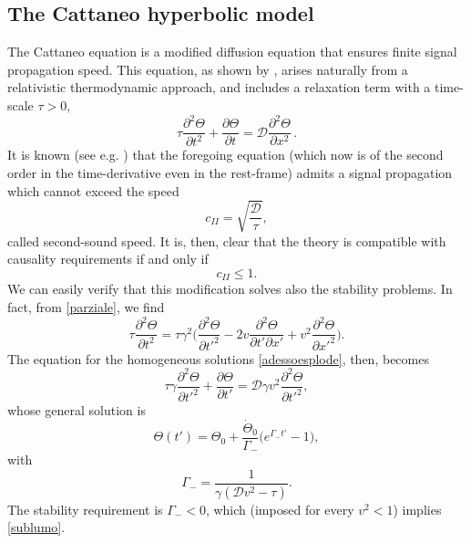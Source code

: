 \documentclass[a4paper, amsfonts, amssymb, amsmath, reprint, showkeys, nofootinbib, twoside]{revtex4-1}
\begin{document}
\subsection{The Cattaneo hyperbolic model}

The Cattaneo equation \citep{cattaneo1958} is a  modified diffusion equation that ensures finite signal propagation speed. This equation, as shown by \citet{Israel_Stewart_1979}, arises naturally from a relativistic thermodynamic approach, and 
includes a relaxation term with a time-scale $\tau>0$, 
%
\begin{equation}\label{cattaneoequation}
\tau \dfrac{\partial^2 \Theta}{\partial t^2} +\dfrac{\partial \Theta}{\partial t} = \mathcal{D} \dfrac{\partial^2 \Theta}{\partial x^2}\, .
\end{equation}
%
It is known (see e.g. \cite{Kost2000}) that the foregoing equation (which now is of the second order in the time-derivative even in the rest-frame) admits a signal propagation which cannot exceed the speed
\begin{equation}
c_{II} = \sqrt{\dfrac{\mathcal{D}}{\tau}},
\end{equation} 
called second-sound speed. It is, then, clear that the theory is compatible with causality requirements if and only if
\begin{equation}\label{sublumo}
c_{II} \leq 1.
\end{equation}
We can easily verify that this modification solves also the stability problems. In fact, from \eqref{parziale}, we find
\begin{equation}
\tau \dfrac{\partial^2 \Theta}{\partial t^2} = \tau \gamma^2 \bigg( \dfrac{\partial^2 \Theta}{\partial {t'}^2} -2 v \dfrac{\partial^2 \Theta}{\partial t' \partial x'} + v^2 \dfrac{\partial^2 \Theta}{\partial {x'}^2} \bigg).
\end{equation}
The equation for the homogeneous solutions \eqref{adessoesplode}, then, becomes
\begin{equation}
\tau \gamma \dfrac{\partial^2 \Theta}{\partial {t'}^2} + \dfrac{\partial \Theta}{\partial t'}  =\mathcal{D} \gamma  v^2 \dfrac{\partial^2 \Theta}{\partial {t'}^2},
\end{equation}
whose general solution is
\begin{equation}
\Theta (t') = \Theta_0 + \dfrac{\dot{\Theta}_0}{\Gamma_-} \big(e^{\Gamma_- t'}-1 \big) ,
\end{equation}
with
\begin{equation}
\Gamma_- = \dfrac{1}{\gamma(\mathcal{D}v^2-\tau)}.
\end{equation}
The stability requirement is $\Gamma_- <0$, which (imposed for every $v^2<1$) implies \eqref{sublumo}.
\end{document}
